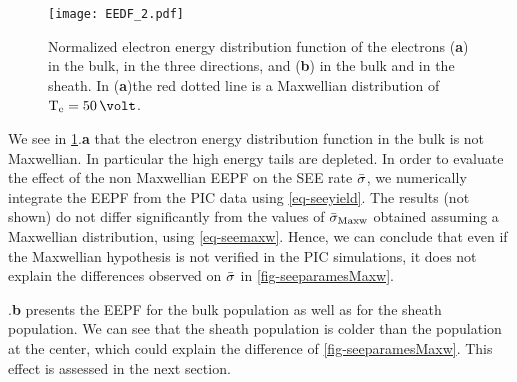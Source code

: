      \begin{figure}[hbt]
       \centering
       \texttt{[image: EEDF\_2.pdf]}
       \caption{Normalized electron energy distribution function of the electrons ({\bf a}) in the bulk, in the three directions, and ({\bf b}) in the bulk and in the sheath. In ({\bf a})the red dotted line is  a Maxwellian distribution of $\Te=50\,\volt$. }
       \label{fig-EEDF}
     \end{figure}
     
    We see in \cref{fig-EEDF}.{\bf a} that the electron energy distribution function in the bulk is not Maxwellian.
    In particular the high energy tails are depleted.
    In order to evaluate the effect of the non Maxwellian EEPF on the \ac{SEE} rate $ \bar{\sigma }$, we numerically integrate the EEPF from the PIC data using \cref{eq-seeyield}.
    The results (not shown) do not differ significantly from the values of $ \bar{\sigma }_{\rm Maxw}$ obtained assuming a Maxwellian distribution, using \cref{eq-seemaxw}.
    Hence, we can conclude that even if the Maxwellian hypothesis is not verified in the PIC simulations, it does not explain  the differences observed on $ \bar{\sigma }$ in \cref{fig-seeparamesMaxw}.


    .{\bf b} presents the EEPF for the bulk population as well as for the sheath population.
    We can see that the sheath population is colder than the population at the center, which could explain the difference of \cref{fig-seeparamesMaxw}. 
    This effect is assessed in the next section.

